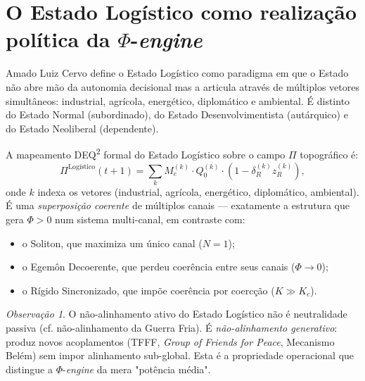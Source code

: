 \documentclass[12pt]{article}
\theoremstyle{definition}
\theoremstyle{remark}
\newtheorem{remark}{Observa\c{c}\~{a}o}
\providecommand{\tightlist}{\setlength{\itemsep}{0pt}\setlength{\parskip}{0pt}}
\begin{document}
\section{O Estado Log\'{i}stico como realiza\c{c}\~{a}o pol\'{i}tica da \(\Phi\)-\textit{engine}}

Amado Luiz Cervo \citep{cervo2008} define o Estado Log\'{i}stico como paradigma em que o Estado n\~{a}o abre m\~{a}o da autonomia decisional mas a articula atrav\'{e}s de m\'{u}ltiplos vetores simult\^{a}neos: industrial, agr\'{i}cola, energ\'{e}tico, diplom\'{a}tico e ambiental. \'{E} distinto do Estado Normal (subordinado), do Estado Desenvolvimentista (autárquico) e do Estado Neoliberal (dependente).

A mapeamento DEQ\textsuperscript{2} formal do Estado Log\'{i}stico sobre o campo \(\Pi\) topogr\'{a}fico \'{e}:
\begin{equation}\label{eq:logistico}
\Pi^{\text{Log\'{i}stico}}(t+1) = \sum_{k} M_e^{(k)} \cdot Q_0^{(k)} \cdot (1 - \delta_R^{(k)} z_R^{(k)}),
\end{equation}
onde \(k\) indexa os vetores (industrial, agr\'{i}cola, energ\'{e}tico, diplom\'{a}tico, ambiental). \'{E} uma \textit{superposi\c{c}\~{a}o coerente} de m\'{u}ltiplos canais --- exatamente a estrutura que gera \(\Phi > 0\) num sistema multi-canal, em contraste com:

\begin{itemize}\tightlist
\item o Soliton, que maximiza um \'{u}nico canal (\(N=1\));
\item o Egem\^{o}n Decoerente, que perdeu coer\^{e}ncia entre seus canais (\(\Phi \to 0\));
\item o R\'{i}gido Sincronizado, que imp\~{o}e coer\^{e}ncia por coerc\c{c}\~{a}o (\(K \gg K_c\)).
\end{itemize}

\begin{remark}
O n\~{a}o-alinhamento ativo do Estado Log\'{i}stico n\~{a}o \'{e} neutralidade passiva (cf. n\~{a}o-alinhamento da Guerra Fria). \'{E} \textit{n\~{a}o-alinhamento generativo}: produz novos acoplamentos (TFFF, \textit{Group of Friends for Peace}, Mecanismo Bel\'{e}m) sem impor alinhamento sub-global. Esta \'{e} a propriedade operacional que distingue a \(\Phi\)-\textit{engine} da mera "pot\^{e}ncia m\'{e}dia".
\end{remark}

\end{document}
